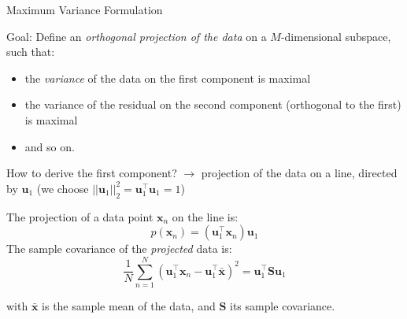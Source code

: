 \documentclass{beamer}
\begin{document}
\begin{frame}{Maximum Variance Formulation}

Goal: Define an \emph{orthogonal projection of the data} on a $M$-dimensional subspace, such that:
\begin{itemize}
\item the \emph{variance} of the data on the first component is maximal
\item the variance of the residual on the second component (orthogonal to the first) is maximal
\item and so on.
\end{itemize}

How to derive the first component?
$\rightarrow$ projection of the data on a line, directed by $\mathbf{u}_{1}$ (we choose $||\mathbf{u}_{1}||_{2}^{2}=\mathbf{u}_{1}^{\top}\mathbf{u}_{1}=1$)\\

\vspace{0.25cm}

The projection of a data point $\mathbf{x}_{n}$ on the line is:
\begin{equation*}
p(\mathbf{x}_{n}) = (\mathbf{u}_{1}^{\top}\mathbf{x}_{n})\mathbf{u}_{1}
\end{equation*}
The sample covariance of the \emph{projected} data is:
\begin{equation*}
\frac{1}{N} \sum_{n=1}^{N} (\mathbf{u}_{1}^{\top}\mathbf{x}_{n} -  \mathbf{u}_{1}^{\top} \bar{\mathbf{x}})^{2} = \mathbf{u}_{1}^{\top} \mathbf{S}\mathbf{u}_{1}
\end{equation*}

with $\bar{\mathbf{x}}$ is the sample mean of the data, and $\mathbf{S}$ its sample covariance.

\end{frame}
\end{document}
